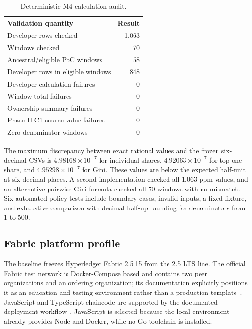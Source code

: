 \begin{table}[H]
\centering
\small
\renewcommand{\arraystretch}{1.08}
\begin{tabular}{lr}
\toprule
\textbf{Validation quantity} & \textbf{Result} \\
\midrule
Developer rows checked & 1,063 \\
Windows checked & 70 \\
Ancestral/eligible PoC windows & 58 \\
Developer rows in eligible windows & 848 \\
Developer calculation failures & 0 \\
Window-total failures & 0 \\
Ownership-summary failures & 0 \\
Phase II C1 source-value failures & 0 \\
Zero-denominator windows & 0 \\
\bottomrule
\end{tabular}
\caption{Deterministic M4 calculation audit.}
\label{tab:m4_deterministic_audit}
\end{table}

The maximum discrepancy between exact rational values and the frozen six-decimal CSVs is
$4.98168\times10^{-7}$ for individual shares, $4.92063\times10^{-7}$ for top-one share, and
$4.95298\times10^{-7}$ for Gini. These values are below the expected half-unit at six decimal places. A second
implementation checked all 1,063 ppm values, and an alternative pairwise Gini formula checked all 70 windows with no
mismatch. Six automated policy tests include boundary cases, invalid inputs, a fixed fixture, and exhaustive comparison
with decimal half-up rounding for denominators from 1 to 500.

\subsection{Fabric platform profile}
\label{sec:phase3_fabric_profile}

The baseline freezes Hyperledger Fabric 2.5.15 from the 2.5 LTS line. The official Fabric test network is
Docker-Compose based and contains two peer organizations and an ordering organization; its documentation explicitly
positions it as an education and testing environment rather than a production
template~\cite{fabricTestNetwork,fabricRelease2515}. JavaScript and TypeScript chaincode are supported by the documented deployment
workflow~\cite{fabricDeployChaincode}. JavaScript is selected because the local environment already provides Node and Docker,
while no Go toolchain is installed.

